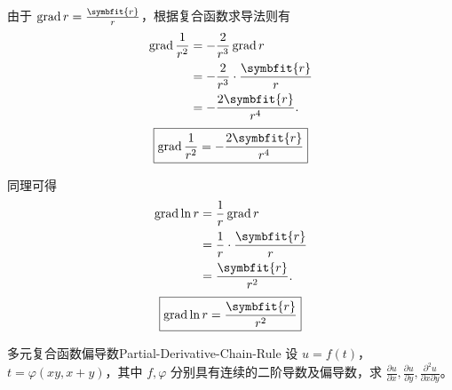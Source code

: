 \begin{solution}

    由于 $\operatorname{grad} r = \frac{\symbfit{r}}{r}$，根据复合函数求导法则有
    \begin{equation}
        \begin{aligned}
            \operatorname{grad} \frac{1}{r^2} & = -\frac{2}{r^3} \operatorname{grad} r       \\
                                              & = -\frac{2}{r^3} \cdot \frac{\symbfit{r}}{r} \\
                                              & = -\frac{2 \symbfit{r}}{r^4}.
        \end{aligned}
    \end{equation}
    \begin{equation}
        \boxed{\operatorname{grad} \frac{1}{r^2} = -\frac{2 \symbfit{r}}{r^4}}
    \end{equation}


    同理可得
    \begin{equation}
        \begin{aligned}
            \operatorname{grad} \ln r & = \frac{1}{r} \operatorname{grad} r       \\
                                      & = \frac{1}{r} \cdot \frac{\symbfit{r}}{r} \\
                                      & = \frac{\symbfit{r}}{r^2}.
        \end{aligned}
    \end{equation}
    \begin{equation}
        \boxed{\operatorname{grad} \ln r = \frac{\symbfit{r}}{r^2}}
    \end{equation}
\end{solution}

\begin{problem}{多元复合函数偏导数}{Partial-Derivative-Chain-Rule}
    设 $u = f(t)$，$t = \varphi(xy, x + y)$，其中 $f, \varphi$ 分别具有连续的二阶导数及偏导数，求 $\frac{\partial u}{\partial x}, \frac{\partial u}{\partial y}, \frac{\partial^2 u}{\partial x \partial y}$。
\end{problem}

